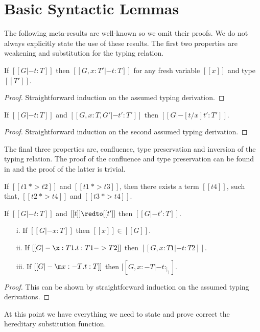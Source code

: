 \section{Basic Syntactic Lemmas}
\label{sec:basic_syntactic_lemmas}
The following meta-results are well-known so we omit their proofs.  We
do not always explicitly state the use of these results.  The first
two properties are weakening and substitution for the typing relation.

\begin{lemma}
  \label{lemma:weakening_for_typing}
  If $[[G |- t : T]]$ then $[[G,x:T' |- t : T]]$ for any fresh variable $[[x]]$ and
  type $[[T']]$.
\end{lemma}
\begin{proof}
  Straightforward induction on the assumed typing derivation.
\end{proof}

\begin{lemma}
  \label{lemma:substitution_for_typing}
  If $[[G |- t : T]]$ and $[[G,x:T,G' |- t':T']]$ then $[[G |- [t/x]t':T']]$.
\end{lemma}
\begin{proof}
  Straightforward induction on the second assumed typing derivation.
\end{proof}
\noindent
The final three properties are, confluence, type preservation and inversion of the typing
relation. The proof of the confluence and type preservation can be found in \cite{Rehof:1994}
and the proof of the latter is trivial.

\begin{thm}[Confluence]
  \label{thm:confluence}
  If $[[t1 ~*> t2]]$ and $[[t1 ~*> t3]]$, then there exists a term $[[t4]]$, such that,
  $[[t2 ~*> t4]]$ and $[[t3 ~*> t4]]$.
\end{thm}

\begin{thm}[Preservation]
  \label{thm:preservation}
  If $[[G |- t : T]]$ and $[[t]] \redto [[t']]$ then $[[G |- t' : T]]$.
\end{thm}

\begin{thm}[Inversion]
  \label{theorem:inversion}
  \begin{itemize}
  \item[]
  \item[i.] If $[[G |- x : T]]$ then $[[x]] \in [[G]]$.
  \item[ii.] If $[[G |- \x:T1.t:T1->T2]]$ then $[[G, x:T1 |- t:T2]]$.
  \item[iii.] If $[[G |- \m x:{-T}.t:T]]$ then $[[G, x:{-T} |- t: _|_]]$.
  \end{itemize}
\end{thm}
\begin{proof}
  This can be shown by straightforward induction on the assumed typing derivations.
\end{proof}
\noindent
At this point we have everything we need to state and prove correct
the hereditary substitution function.

